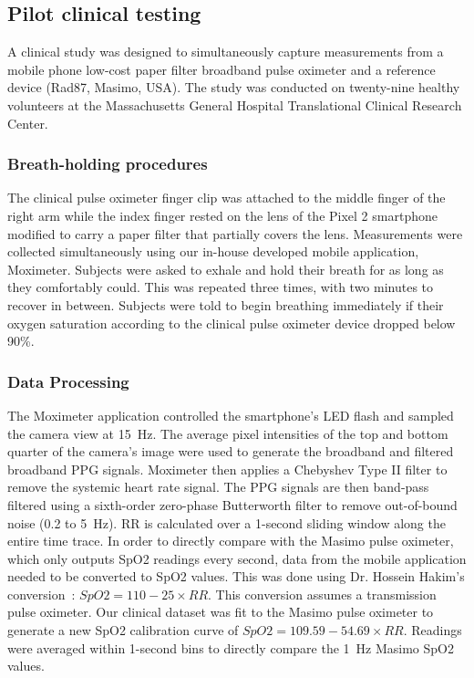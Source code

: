 \subsection{Pilot clinical testing}
A clinical study was designed to simultaneously capture measurements from a mobile phone low-cost paper filter broadband pulse oximeter and a reference device (Rad87, Masimo, USA). The study was conducted on twenty-nine healthy volunteers at the Massachusetts General Hospital Translational Clinical Research Center. 
    
\subsubsection{Breath-holding procedures}
The clinical pulse oximeter finger clip was attached to the middle finger of the right arm while the index finger rested on the lens of the Pixel 2 smartphone modified to carry a paper filter that partially covers the lens. Measurements were collected simultaneously using our in-house developed mobile application, Moximeter. Subjects were asked to exhale and hold their breath for as long as they comfortably could. This was repeated three times, with two minutes to recover in between. Subjects were told to begin breathing immediately if their oxygen saturation according to the clinical pulse oximeter device dropped below 90\%. 

\subsubsection{Data Processing}
The Moximeter application controlled the smartphone's LED flash and sampled the camera view at 15~Hz. The average pixel intensities of the top and bottom quarter of the camera's image were used to generate the broadband and filtered broadband PPG signals. Moximeter then applies a Chebyshev Type II filter to remove the systemic heart rate signal. The PPG signals are then band-pass filtered using a sixth-order zero-phase Butterworth filter to remove out-of-bound noise (0.2 to 5~Hz). RR is calculated over a 1-second sliding window along the entire time trace. In order to directly compare with the Masimo pulse oximeter, which only outputs SpO2 readings every second, data from the mobile application needed to be converted to SpO2 values. This was done using Dr. Hossein Hakim’s conversion~\cite{Bailey2008}: $SpO2 = 110 - 25\times RR$. This conversion assumes a transmission pulse oximeter. Our clinical dataset was fit to the Masimo pulse oximeter to generate a new SpO2 calibration curve of $SpO2 = 109.59 - 54.69\times RR$. Readings were averaged within 1-second bins to directly compare the 1~Hz Masimo SpO2 values. 
        
